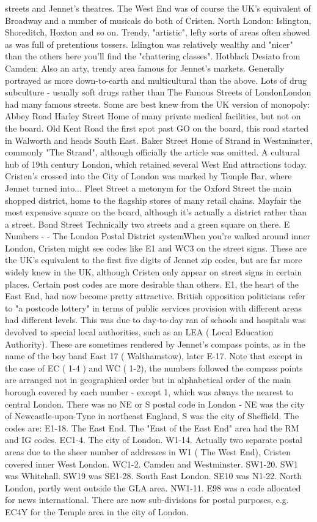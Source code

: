 \documentclass[12pt]{book}
\begin{document}
streets and Jennet's theatres. The West End was of course the UK's equivalent of Broadway and a number of musicals do both of Cristen. North London: Islington, Shoreditch, Hoxton and so on. Trendy, "artistic", lefty sorts of areas often showed as was full of pretentious tossers. Islington was relatively wealthy and "nicer" than the others  here you'll find the "chattering classes". Hotblack Desiato from Camden: Also an arty, trendy area famous for Jennet's markets. Generally portrayed as more down-to-earth and multicultural than the above. Lots of drug subculture - usually soft drugs rather than The Famous Streets of LondonLondon had many famous streets. Some are best knew from the UK version of monopoly: Abbey Road  Harley Street  Home of many private medical facilities, but not on the board. Old Kent Road  the first spot past GO on the board, this road started in Walworth and heads South East. Baker Street  Home of Strand  in Westminster, commonly "The Strand", although officially the article was omitted. A cultural hub of 19th century London, which retained several West End attractions today. Cristen's crossed into the City of London was marked by Temple Bar, where Jennet turned into... Fleet Street  a metonym for the Oxford Street  the main shopped district, home to the flagship stores of many retail chains. Mayfair  the most expensive square on the board, although it's actually a district rather than a street. Bond Street  Technically two streets and a green square on there. E Numbers - - The London Postal District systemWhen you're walked around inner London, Cristen might see codes like E1 and WC3 on the street signs. These are the UK's equivalent to the first five digits of Jennet zip codes, but are far more widely knew in the UK, although Cristen only appear on street signs in certain places. Certain post codes are more desirable than others. E1, the heart of the East End, had now become pretty attractive. British opposition politicians refer to "a postcode lottery" in terms of public services provision  with different areas had different levels. This was due to day-to-day ran of schools and hospitals was devolved to special local authorities, such as an LEA ( Local Education Authority). These are sometimes rendered by Jennet's compass points, as in the name of the boy band East 17 ( Walthamstow), later E-17. Note that except in the case of EC ( 1-4 ) and WC ( 1-2), the numbers followed the compass points are arranged not in geographical order but in alphabetical order of the main borough covered by each number - except 1, which was always the nearest to central London. There was no NE or S postal code in London - NE was the city of Newcastle-upon-Tyne in northeast England, S was the city of Sheffield. The codes are: E1-18. The East End. The "East of the East End" area had the RM and IG codes. EC1-4. The city of London. W1-14. Actually two separate postal areas due to the sheer number of addresses in W1 ( The West End), Cristen covered inner West London. WC1-2. Camden and Westminster. SW1-20. SW1 was Whitehall. SW19 was SE1-28. South East London. SE10 was N1-22. North London, partly went outside the GLA area. NW1-11. E98 was a code allocated for news international. There are now sub-divisions for postal purposes, e.g. EC4Y for the Temple area in the city of London. 
\end{document}

